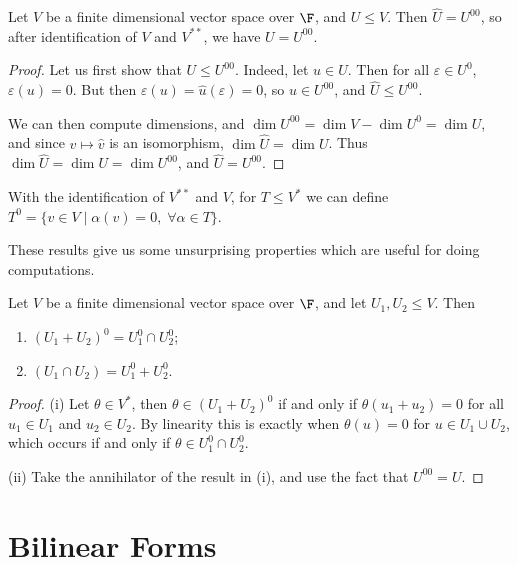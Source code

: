 \begin{lemma}
    Let $V$ be a finite dimensional vector space over $\F$, and $U \leq V$. Then
    $\hat{U} = U^{00}$, so after identification of $V$ and $V^{**}$, we have $U = U^{00}$.
\end{lemma}
\begin{proof}
    Let us first show that $U \leq U^{00}$. Indeed, let $u \in U$. Then for all $\varepsilon \in U^0$, $\varepsilon(u) = 0$. But then $\varepsilon(u) = \hat{u}(\varepsilon) = 0$, so $\hat{u} \in U^{00}$, and $\hat{U} \leq U^{00}$.
    
    We can then compute dimensions, and $\dim U^{00} = \dim V - \dim U^{0} = \dim U$, and since $v \mapsto \hat{v}$ is an isomorphism, $\dim \hat{U} = 
    \dim U$. Thus $\dim \hat{U} = \dim U = \dim U^{00}$, and $\hat{U} = U^{00}$.
\end{proof}

\begin{remark}
    With the identification of $V^{**}$ and $V$, for $T \leq V^{*}$ we can define $T^0 = \{v \in V \mid \alpha(v) = 0, \; \forall \alpha \in T\}$.
\end{remark}

These results give us some unsurprising properties which are useful for doing computations.

\begin{lemma}
    Let $V$ be a finite dimensional vector space over $\F$, and let $U_1, U_2 \leq V$. Then 
    \begin{enumerate}[label=(\roman*)]
        \item $(U_1 + U_2)^0 = U_1^0 \cap U_2^0$;
        \item $(U_1 \cap U_2) = U_1^0 + U_2^0$.
    \end{enumerate}
\end{lemma}
\begin{proof}
    (i) Let $\theta \in V^*$, then $\theta \in (U_1 + U_2)^0$ if and only if $\theta(u_1 + u_2) = 0$ for all $u_1 \in U_1$ and $u_2 \in U_2$. By linearity this is exactly when $\theta(u) = 0$ for $u \in U_1 \cup U_2$, which occurs if and only if $\theta \in U_1^0 \cap U_2^0$.

    (ii) Take the annihilator of the result in (i), and use the fact that $U^{00} = U$.
\end{proof}

\section{Bilinear Forms}


